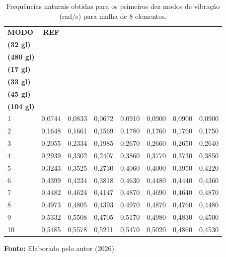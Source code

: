 
\begin{table}[htbp]
    \centering
    \caption{Frequências naturais obtidas para os primeiros dez modos de vibração (rad/s) para malha de 8 elementos.}
    \label{tab:5.1}
    \small %
    \begin{tabular}{lccccccc}
        \toprule
        \textbf{MODO} & \textbf{REF} & \makecell{\textbf{MEF}\\\textbf{(32 gl)}} & \makecell{\textbf{MEFG}\\\textbf{(480 gl)}} & \makecell{\textbf{MEV}\\\textbf{(17 gl)}} & \makecell{\textbf{MEV}\\\textbf{(33 gl)}} & \makecell{\textbf{MEV}\\\textbf{(45 gl)}} & \makecell{\textbf{MEV}\\\textbf{(104 gl)}} \\
        \midrule
        1  & 0,0744 & 0,0833 & 0,0672 & 0,0910 & 0,0900 & 0,0900 & 0,0900 \\
        2  & 0,1648 & 0,1661 & 0,1569 & 0,1780 & 0,1760 & 0,1760 & 0,1750 \\
        3  & 0,2055 & 0,2334 & 0,1985 & 0,2670 & 0,2660 & 0,2650 & 0,2640 \\
        4  & 0,2939 & 0,3302 & 0,2407 & 0,3860 & 0,3770 & 0,3730 & 0,3850 \\
        5  & 0,3243 & 0,3525 & 0,2730 & 0,4060 & 0,4000 & 0,3950 & 0,4220 \\
        6  & 0,4399 & 0,4234 & 0,3818 & 0,4630 & 0,4480 & 0,4440 & 0,4360 \\
        7  & 0,4482 & 0,4624 & 0,4147 & 0,4870 & 0,4690 & 0,4640 & 0,4870 \\
        8  & 0,4973 & 0,4805 & 0,4393 & 0,4970 & 0,4870 & 0,4760 & 0,4480 \\
        9  & 0,5332 & 0,5508 & 0,4705 & 0,5170 & 0,4980 & 0,4830 & 0,4500 \\
        10 & 0,5485 & 0,5578 & 0,5211 & 0,5470 & 0,5020 & 0,4860 & 0,4530 \\
        \bottomrule
    \end{tabular}
    
    \vspace{0.2cm}
    \raggedright
    \textbf{Fonte:} Elaborado pelo autor (2026).
\end{table}

